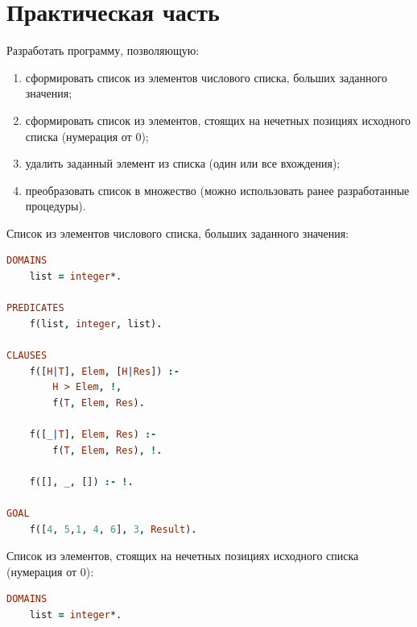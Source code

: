 \documentclass[a4paper,oneside,12pt]{extreport}
\begin{document}


\section*{Практическая часть}

\begin{task}
    Разработать программу, позволяющую:
    \begin{enumerate}
        \item сформировать список из элементов числового списка, больших заданного значения;
        \item сформировать список из элементов, стоящих на нечетных позициях исходного списка (нумерация от 0);
        \item удалить заданный элемент из списка (один или все вхождения);
        \item преобразовать список в множество (можно использовать ранее разработанные процедуры).
    \end{enumerate}

    Список из элементов числового списка, больших заданного значения:
    \begin{lstlisting}[language=Prolog]
DOMAINS
    list = integer*.

PREDICATES
    f(list, integer, list).

CLAUSES
    f([H|T], Elem, [H|Res]) :-
        H > Elem, !,
        f(T, Elem, Res).
        
    f([_|T], Elem, Res) :-
        f(T, Elem, Res), !.
    
    f([], _, []) :- !.

GOAL
    f([4, 5,1, 4, 6], 3, Result).
    \end{lstlisting}

    \begin{figure}[ht!]
        \end{figure}

    \newpage

    Список из элементов, стоящих на нечетных позициях исходного списка (нумерация от 0):
    \begin{lstlisting}[language=Prolog]
DOMAINS
    list = integer*.
    

\end{lstlisting}
\end{task}
\end{document}
